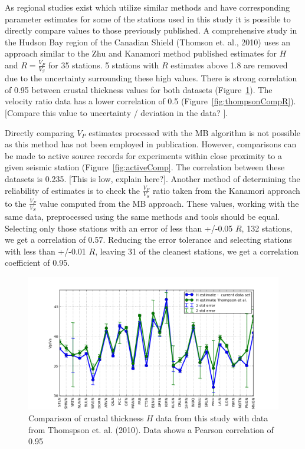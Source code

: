 \documentclass[draft, 12pt]{article}
\begin{document}
As regional studies exist which utilize similar methods and have corresponding parameter estimates for some of the stations used in this study it is possible to directly compare values to those previously published. A comprehensive study in the Hudson Bay region of the Canadian Shield (Thomson et. al., 2010) uses an approach similar to the Zhu and Kanamori method published estimates for $H$ and $R=\frac{V_P}{V_S}$ for 35 stations. 5 stations with $R$ estimates above 1.8 are removed due to the uncertainty surrounding these high values. There is strong correlation of 0.95 between crustal thickness values for both datasets (Figure~\ref{fig:thompsonCompH}). The velocity ratio data has a lower correlation of 0.5 (Figure~\ref{fig:thompsonCompR}). [Compare this value to uncertainty / deviation in the data? ].

Directly comparing $V_P$ estimates processed with the MB algorithm is not possible as this method has not been employed in publication. However, comparisons can be made to active source records for experiments within close proximity to a given seismic station (Figure~\ref{fig:activeComp}. The correlation between these datasets is 0.235. [This is low, explain here?]. Another method of determining the reliability of estimates is to check the $\frac{V_P}{V_S}$ ratio taken from the Kanamori approach to the $\frac{V_P}{V_S}$ value computed from the MB approach. These values, working with the same data, preprocessed using the same methods and tools should be equal. Selecting only those stations with an error of less than +/-0.05 $R$, 132 stations, we get a correlation of 0.57. Reducing the error tolerance and selecting stations with less than +/-0.01 $R$, leaving 31 of the cleanest stations, we get a correlation coefficient of 0.95.

\begin{figure}
  \centering
    \includegraphics[width=\textwidth]{thompsonComparisonH}
  \caption{Comparison of crustal thickness $H$ data from this study with data from Thomspson et. al. (2010). Data shows a Pearson correlation of 0.95}
  \label{fig:thompsonCompH}
\end{figure}
\end{document}
